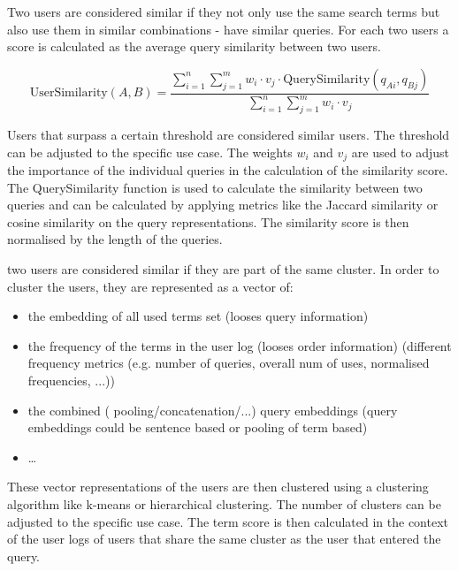 Two users are considered similar if they not only use the same search terms but also use them in similar combinations - have similar queries.
For each two users a score is calculated as the average query similarity between two users.

\[
\text{UserSimilarity}(A, B) = \frac{\sum_{i=1}^n \sum_{j=1}^m w_i \cdot v_j \cdot \text{QuerySimilarity}(q_{Ai}, q_{Bj})}{\sum_{i=1}^n \sum_{j=1}^m w_i \cdot v_j}
\]

Users that surpass a certain threshold are considered similar users. The threshold can be adjusted to the specific use case. 
The weights $w_i$ and $v_j$ are used to adjust the importance of the individual queries in the calculation of the similarity score. 
The QuerySimilarity function is used to calculate the similarity between two queries and can be calculated by applying metrics like the Jaccard similarity or cosine similarity on the query representations.
The similarity score is then normalised by the length of the queries.


two users are considered similar if they are part of the same cluster. In order to cluster the users, they are represented as a vector of:
\begin{itemize}
    \item the embedding of all used terms set (looses query information)
    \item the frequency of the terms in the user log (looses order information) (different frequency metrics (e.g. number of queries, overall num of uses, normalised frequencies, ...))
    \item the combined ( pooling/concatenation/...) query embeddings (query embeddings could be sentence based or pooling of term based)
    \item \dots
\end{itemize}

These vector representations of the users are then clustered using a clustering algorithm like k-means or hierarchical clustering. 
The number of clusters can be adjusted to the specific use case.
The term score is then calculated in the context of the user logs of users that share the same cluster as the user that entered the query. 

